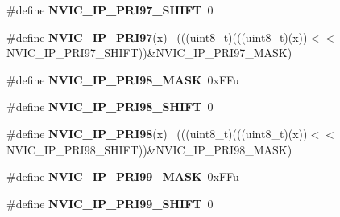 \begin{DoxyCompactItemize}
\item 
\hypertarget{group___n_v_i_c___register___masks_ga24fc8bd4a3cb218028e437e807753582}{}\#define {\bfseries N\+V\+I\+C\+\_\+\+I\+P\+\_\+\+P\+R\+I97\+\_\+\+S\+H\+I\+F\+T}~0\label{group___n_v_i_c___register___masks_ga24fc8bd4a3cb218028e437e807753582}

\item 
\hypertarget{group___n_v_i_c___register___masks_ga02b65f8f1910b0d92f8f01853e2c934f}{}\#define {\bfseries N\+V\+I\+C\+\_\+\+I\+P\+\_\+\+P\+R\+I97}(x)                                              ~(((uint8\+\_\+t)(((uint8\+\_\+t)(x))$<$$<$N\+V\+I\+C\+\_\+\+I\+P\+\_\+\+P\+R\+I97\+\_\+\+S\+H\+I\+F\+T))\&N\+V\+I\+C\+\_\+\+I\+P\+\_\+\+P\+R\+I97\+\_\+\+M\+A\+S\+K)\label{group___n_v_i_c___register___masks_ga02b65f8f1910b0d92f8f01853e2c934f}

\item 
\hypertarget{group___n_v_i_c___register___masks_gae9c1e25c5d649e2f52ec79ba7322c6a5}{}\#define {\bfseries N\+V\+I\+C\+\_\+\+I\+P\+\_\+\+P\+R\+I98\+\_\+\+M\+A\+S\+K}~0x\+F\+Fu\label{group___n_v_i_c___register___masks_gae9c1e25c5d649e2f52ec79ba7322c6a5}

\item 
\hypertarget{group___n_v_i_c___register___masks_ga9a44d04cd7bb42c8f24249cf9eed96b1}{}\#define {\bfseries N\+V\+I\+C\+\_\+\+I\+P\+\_\+\+P\+R\+I98\+\_\+\+S\+H\+I\+F\+T}~0\label{group___n_v_i_c___register___masks_ga9a44d04cd7bb42c8f24249cf9eed96b1}

\item 
\hypertarget{group___n_v_i_c___register___masks_ga243ac757d4af6c46bb9ab06848ea0abb}{}\#define {\bfseries N\+V\+I\+C\+\_\+\+I\+P\+\_\+\+P\+R\+I98}(x)                                              ~(((uint8\+\_\+t)(((uint8\+\_\+t)(x))$<$$<$N\+V\+I\+C\+\_\+\+I\+P\+\_\+\+P\+R\+I98\+\_\+\+S\+H\+I\+F\+T))\&N\+V\+I\+C\+\_\+\+I\+P\+\_\+\+P\+R\+I98\+\_\+\+M\+A\+S\+K)\label{group___n_v_i_c___register___masks_ga243ac757d4af6c46bb9ab06848ea0abb}

\item 
\hypertarget{group___n_v_i_c___register___masks_gac6249f94b19ecd0528929cb8292d4c34}{}\#define {\bfseries N\+V\+I\+C\+\_\+\+I\+P\+\_\+\+P\+R\+I99\+\_\+\+M\+A\+S\+K}~0x\+F\+Fu\label{group___n_v_i_c___register___masks_gac6249f94b19ecd0528929cb8292d4c34}

\item 
\hypertarget{group___n_v_i_c___register___masks_ga40abb70544a8c4d66a5cdc9068d2a841}{}\#define {\bfseries N\+V\+I\+C\+\_\+\+I\+P\+\_\+\+P\+R\+I99\+\_\+\+S\+H\+I\+F\+T}~0\label{group___n_v_i_c___register___masks_ga40abb70544a8c4d66a5cdc9068d2a841}


\end{DoxyCompactItemize}
